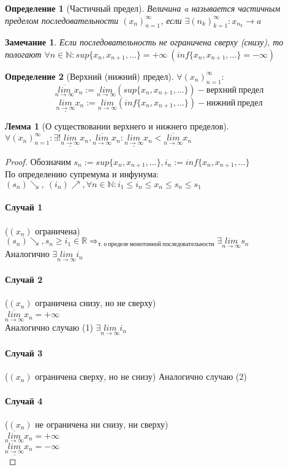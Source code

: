 \documentclass[12pt, a4]{article}
\newtheorem*{definition}{Определение}
\newtheorem*{remark}{Замечание}
\newtheorem*{lemma}{Лемма}
\renewcommand{\lim}[2]{\underset{#1 \rightarrow #2}{lim}}
\newcommand{\limn}{\lim{n}{\infty}}
\renewcommand{\implies}{\Rightarrow}
\newcommand{\limsupn}{\overline{\limn}}
\newcommand{\liminfn}{\underline{\limn}}
\newcommand{\R}{\mathbb{R}}
\newcommand{\N}{\mathbb{N}}
\begin{document}
\begin{definition}[Частичный предел]
Величина a называется частичным пределом последовательности $(x_n)_{n=1}^\infty$, если $\exists (n_k)_{k=1}^\infty: x_{n_k} \to a$
\end{definition}

\begin{remark}
Если последовательность не ограничена сверху (снизу), то пологают $\forall n \in \N: sup\{x_n, x_{n+1}, ...\} = +\infty\ (inf\{x_n, x_{n+1}, ...\} = -\infty)$
\end{remark}

\begin{definition}[Верхний (нижний) предел]
$\forall (x_n)_{n=1}^\infty:$\\
\[\limsupn x_n := \limn (sup \{x_n, x_{n+1}, ...\}) - верхний\ предел\]
\[\liminfn x_n := \limn (inf \{x_n, x_{n+1}, ...\}) - нижний\ предел\]
\end{definition}

\begin{lemma}[О существовании верхнего и нижнего пределов]
$\forall (x_n)_{n=1}^\infty: \exists!\liminfn x_n, \limsupn x_n: \liminfn x_n < \limsupn x_n$
\end{lemma}

\begin{proof}
Обозначим $s_n := sup\{x_n, x_{n+1}, ...\}, i_n := inf\{x_n, x_{n+1}, ...\}$\\
По определению супремума и инфунума: $(s_n)\searrow,\ (i_n)\nearrow, \forall n \in \N: i_1 \leq i_n \leq x_n \leq s_n \leq s_1$\\

\paragraph{Случай 1}($(x_n)$ ограничена)\\
$(s_n) \searrow, s_n \geq i_1 \in \R \implies_{т.\ о\ пределе\ монотонной\ последовательности} \exists \limn s_n$\\
Аналогично $\exists \limn i_n$
\paragraph{Случай 2}($(x_n)$ ограничена снизу, но не сверху)\\
$\limsupn x_n = +\infty$\\
Аналогично случаю (1) $\exists \limn i_n$
\paragraph{Случай 3}($(x_n)$ ограничена сверху, но не снизу) Аналогично случаю (2)
\paragraph{Случай 4}($(x_n)$ не ограничена ни снизу, ни сверху)\\
$\limsupn x_n = +\infty$\\
$\liminfn x_n = -\infty$\\
\end{proof}
\end{document}
